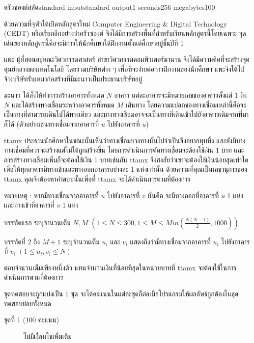 \documentclass[11pt,a4paper]{article}
\begin{document}
\begin{problem}{ครัวซองต์สลัด}{standard input}{standard output}{1 seconds}{256 megabytes}{100}

ด้วยความที่จุฬาได้เปิดหลักสูตรใหม่ Computer Engineering & Digital Technology (CEDT) หรือเรียกอีกอย่างว่าครัวซองต์ จึงได้มีการสร้างพื้นที่สำหรับเรียนหลักสูตรนี้โดยเฉพาะ จุดเด่นของหลักสูตรนี้คือจะมีการให้นักศึกษาได้ฝึกงานตั้งแต่ศึกษาอยู่ชั้นปีที่ 1

แพะ ผู้ที่สอนอยู่คณะวิศวกรรมศาสตร์ สาขาวิศวกรรมคอมพิวเตอร์มานาน จึงได้มีความคิดที่จะสร้างจุดศุนย์กลางของเทคโนโลยี โดยรวมบริษัทต่าง ๆ เพื่อที่จะง่ายต่อการฝึกงานของนักศึกษา แพะจึงได้ไปจ้างบริษัทรับเหมาก่อสร้างที่มีมะนาวเป็นประธานบริษัทอยู่

มะนาว ได้สั่งให้ทำการสร้างอาคารทั้งหมด $N$ อาคาร แต่ละอาคารจะมีหมายเลขของอาคารตั้งแต่ $1$ ถึง $N$ และได้สร้างทางเชื่อมระหว่างอาคารทั้งหมด $M$ เส้นทาง โดยความแปลกของทางเชื่อมเหล่านี้คือจะเป็นทางที่สามารถเดินไปได้ทางเดียว และบางทางเชื่อมอาจจะเป็นทางที่เดินเข้าไปยังอาคารเดิมจากที่มาก็ได้ (ตัวอย่างเช่นทางเชื่อมจากอาคารที่ $u$ ไปยังอาคารที่ $u$)

ttamx ประธานนักศึกษาในขณะนั้นเห็นว่าทางเชื่อมบางทางนั้นไม่จำเป็นจึงอยากทุบทิ้ง และยังมีบางทางเชื่อมที่ควรจะสร้างแต่ไม่ได้ถูกสร้างขึ้น โดยการดำเนินการตัดทางเชื่อมจะต้องใช้เงิน 1 บาท และ การสร้างทางเชื่อมเพิ่มก็จะต้องใช้เงิน 1 บาทเช่นกัน ttamx จึงสงสัยว่าเขาจะต้องใช้เงินน้อยสุดเท่าใดเพื่อให้ทุกอาคารมีทางเข้าและทางออกอาคารอย่างละ 1 แห่งเท่านั้น ด้วยความที่คุณเป็นเลขานุการของ ttamx คุณจึงต้องหาคำตอบนั้นเพื่อที่ ttamx จะได้ดำเนินการตามที่ต้องการ

หมายเหตุ : หากมีทางเชื่อมจากอาคารที่ $u$ ไปยังอาคารที่ $v$ นั่นคือ จะมีทางออกที่อาคารที่ $u$ 1 แห่ง และทางเข้าที่อาคารที่ $v$ 1 แห่ง

\InputFile

บรรทัดแรก ระบุจำนวนเต็ม $N, M$ $(1 \leq N \leq 300, 1 \leq M \leq Min(\frac{N(N-1)}{2}, 1000))$

บรรทัดที่ $2$ ถึง $M + 1$ ระบุจำนวนเต็ม $u_i$ และ $v_i$ แสดงถึงว่ามีทางเชื่อมจากอาคารที่ $u_i$ ไปยังอาคารที่ $v_i$ $(1 \leq u_i, v_i \leq N)$

\OutputFile
ตอบจำนวนเต็มเพียงหนึ่งตัว แทนจำนวนเงินที่น้อยที่สุดในหน่วยบาทที่ ttamx จะต้องใช้ในการดำเนินการตามที่ต้องการ

\Scoring
ชุดทดสอบจะถูกแบ่งเป็น 1 ชุด จะได้คะแนนในแต่ละชุดก็ต่อเมื่อโปรแกรมให้ผลลัพธ์ถูกต้องในชุดทดสอบย่อยทั้งหมด

\begin{description}

\item[ชุดที่ 1 (100 คะแนน)] ไม่มีเงื่อนไขเพิ่มเติม 

\end{description}

\Examples

\begin{example}
%
%
\end{example}

\end{problem}
\end{document}
